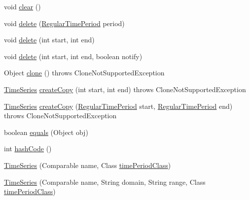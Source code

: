 \begin{DoxyCompactItemize}
\item 
void \mbox{\hyperlink{classorg_1_1jfree_1_1data_1_1time_1_1_time_series_a195539c7622ac01fb882d1e8b2485b5f}{clear}} ()
\item 
void \mbox{\hyperlink{classorg_1_1jfree_1_1data_1_1time_1_1_time_series_ace2380cf1ca286332cc04de19326d160}{delete}} (\mbox{\hyperlink{classorg_1_1jfree_1_1data_1_1time_1_1_regular_time_period}{Regular\+Time\+Period}} period)
\item 
void \mbox{\hyperlink{classorg_1_1jfree_1_1data_1_1time_1_1_time_series_a5133f26d7b87d176e5b07b1cbf189b95}{delete}} (int start, int end)
\item 
void \mbox{\hyperlink{classorg_1_1jfree_1_1data_1_1time_1_1_time_series_a031515137054f19838f3fdf58c4e08dc}{delete}} (int start, int end, boolean notify)
\item 
Object \mbox{\hyperlink{classorg_1_1jfree_1_1data_1_1time_1_1_time_series_a1c681636596d01d246ff4716019459c2}{clone}} ()  throws Clone\+Not\+Supported\+Exception 
\item 
\mbox{\hyperlink{classorg_1_1jfree_1_1data_1_1time_1_1_time_series}{Time\+Series}} \mbox{\hyperlink{classorg_1_1jfree_1_1data_1_1time_1_1_time_series_a2389b70a57490783373cd5de88d00f13}{create\+Copy}} (int start, int end)  throws Clone\+Not\+Supported\+Exception 
\item 
\mbox{\hyperlink{classorg_1_1jfree_1_1data_1_1time_1_1_time_series}{Time\+Series}} \mbox{\hyperlink{classorg_1_1jfree_1_1data_1_1time_1_1_time_series_a975fb6e05236dc555b575cb6fb2066e9}{create\+Copy}} (\mbox{\hyperlink{classorg_1_1jfree_1_1data_1_1time_1_1_regular_time_period}{Regular\+Time\+Period}} start, \mbox{\hyperlink{classorg_1_1jfree_1_1data_1_1time_1_1_regular_time_period}{Regular\+Time\+Period}} end)  throws Clone\+Not\+Supported\+Exception 
\item 
boolean \mbox{\hyperlink{classorg_1_1jfree_1_1data_1_1time_1_1_time_series_af973963b7549b5dbd818e9389585668e}{equals}} (Object obj)
\item 
int \mbox{\hyperlink{classorg_1_1jfree_1_1data_1_1time_1_1_time_series_a3068fa73bcead27777ac0440ce45c95a}{hash\+Code}} ()
\item 
\mbox{\hyperlink{classorg_1_1jfree_1_1data_1_1time_1_1_time_series_a824811f45348f7a63018d62ad52e7f90}{Time\+Series}} (Comparable name, Class \mbox{\hyperlink{classorg_1_1jfree_1_1data_1_1time_1_1_time_series_a8451e52cd1e3aac5ee6bcd1f6e153a6f}{time\+Period\+Class}})
\item 
\mbox{\hyperlink{classorg_1_1jfree_1_1data_1_1time_1_1_time_series_a2f669d9d16af9bff7dde863284cf4968}{Time\+Series}} (Comparable name, String domain, String range, Class \mbox{\hyperlink{classorg_1_1jfree_1_1data_1_1time_1_1_time_series_a8451e52cd1e3aac5ee6bcd1f6e153a6f}{time\+Period\+Class}})
\end{DoxyCompactItemize}
